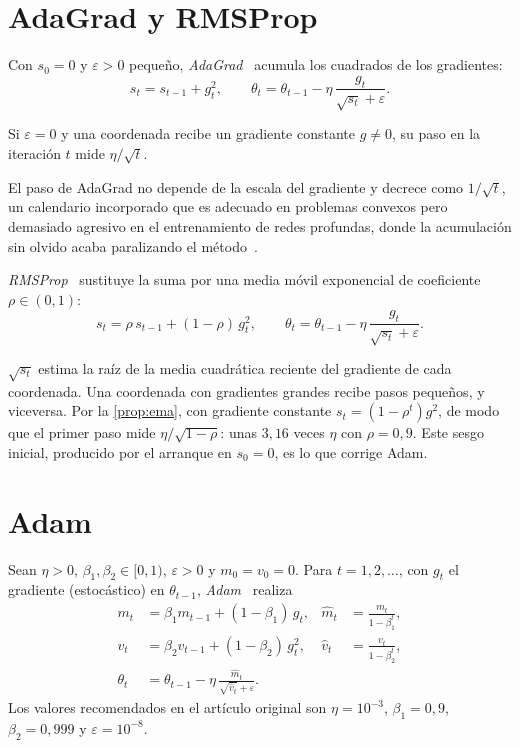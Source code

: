 \section{AdaGrad y RMSProp}

\begin{definicion}[AdaGrad]\label{def:adagrad}
Con $s_0=0$ y $\varepsilon>0$ pequeño, \emph{AdaGrad}~\cite{adagrad} acumula los cuadrados de los gradientes:
\[
s_t=s_{t-1}+g_t^{2},\qquad\theta_t=\theta_{t-1}-\eta\,\frac{g_t}{\sqrt{s_t}+\varepsilon}.
\]
\end{definicion}

\begin{proposicion}\label{prop:adagrad}
Si $\varepsilon=0$ y una coordenada recibe un gradiente constante $g\ne 0$, su paso en la iteración $t$ mide $\eta/\sqrt t$.
\end{proposicion}

El paso de AdaGrad no depende de la escala del gradiente y decrece como $1/\sqrt t$, un calendario incorporado que es adecuado en problemas convexos pero demasiado agresivo en el entrenamiento de redes profundas, donde la acumulación sin olvido acaba paralizando el método~\cite[§8.5.1]{gbc}.

\begin{definicion}[RMSProp]\label{def:rmsprop}
\emph{RMSProp}~\cite{rmsprop} sustituye la suma por una media móvil exponencial de coeficiente $\rho\in(0,1)$:
\[
s_t=\rho\,s_{t-1}+(1-\rho)\,g_t^{2},\qquad\theta_t=\theta_{t-1}-\eta\,\frac{g_t}{\sqrt{s_t}+\varepsilon}.
\]
\end{definicion}

$\sqrt{s_t}$ estima la raíz de la media cuadrática reciente del gradiente de cada coordenada. Una coordenada con gradientes grandes recibe pasos pequeños, y viceversa. Por la \cref{prop:ema}, con gradiente constante $s_t=(1-\rho^{t})g^{2}$, de modo que el primer paso mide $\eta/\sqrt{1-\rho}$: unas $3{,}16$ veces $\eta$ con $\rho=0{,}9$. Este sesgo inicial, producido por el arranque en $s_0=0$, es lo que corrige Adam.

\section{Adam}

\begin{definicion}[Adam]\label{def:adam}
Sean $\eta>0$, $\beta_1,\beta_2\in[0,1)$, $\varepsilon>0$ y $m_0=v_0=0$. Para $t=1,2,\dots$, con $g_t$ el gradiente (estocástico) en $\theta_{t-1}$, \emph{Adam}~\cite[algoritmo~1]{adam} realiza
\begin{align*}
m_t&=\beta_1m_{t-1}+(1-\beta_1)\,g_t, & \hat m_t&=\frac{m_t}{1-\beta_1^{t}},\\
v_t&=\beta_2v_{t-1}+(1-\beta_2)\,g_t^{2}, & \hat v_t&=\frac{v_t}{1-\beta_2^{t}},\\
\theta_t&=\theta_{t-1}-\eta\,\frac{\hat m_t}{\sqrt{\hat v_t}+\varepsilon}.
\end{align*}
Los valores recomendados en el artículo original son $\eta=10^{-3}$, $\beta_1=0{,}9$, $\beta_2=0{,}999$ y $\varepsilon=10^{-8}$.
\end{definicion}

